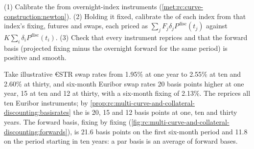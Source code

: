 \begin{method}\label{met:rc:multi-curve-and-collateral-discounting:twostage}
(1) Calibrate the  from overnight-index instruments
(\cref{met:rc:curve-construction:newton}). (2) Holding it fixed, calibrate the
 of each index from that index's fixing, futures and swaps,
each priced as $\sum_j F_j\delta_jP^{\text{disc}}(t_j)$ against $K\sum_i
\delta_iP^{\text{disc}}(t_i)$. (3) Check that every instrument reprices and
that the forward basis (projected fixing minus the overnight forward for the
same period) is positive and smooth.
\end{method}

\label{lst:rc:multi-curve-and-collateral-discounting:proj}

\begin{example}\label{ex:rc:multi-curve-and-collateral-discounting:euro}
Take illustrative €STR swap rates from 1.95\% at one year to 2.55\% at ten
and 2.60\% at thirty, and six-month Euribor swap rates 20 basis points higher
at one year, 15 at ten and 12 at thirty, with a six-month fixing of 2.13\%. The
 reprices all ten Euribor instruments; by
\cref{prop:rc:multi-curve-and-collateral-discounting:basisrates} the  is
20, 15 and 12 basis points at one, ten and thirty years. The forward basis,
fixing by fixing (\cref{fig:rc:multi-curve-and-collateral-discounting:forwards}), is
21.6 basis points on the first six-month period and 11.8 on the period starting
in ten years: a par basis is an average of forward bases.
\end{example}

